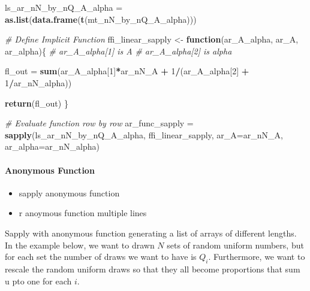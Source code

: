 \documentclass[
]{book}
\newenvironment{Shaded}{\begin{snugshade}}{\end{snugshade}}
\newcommand{\CommentTok}[1]{\textcolor[rgb]{0.56,0.35,0.01}{\textit{#1}}}
\newcommand{\ControlFlowTok}[1]{\textcolor[rgb]{0.13,0.29,0.53}{\textbf{#1}}}
\newcommand{\DataTypeTok}[1]{\textcolor[rgb]{0.13,0.29,0.53}{#1}}
\newcommand{\DecValTok}[1]{\textcolor[rgb]{0.00,0.00,0.81}{#1}}
\newcommand{\KeywordTok}[1]{\textcolor[rgb]{0.13,0.29,0.53}{\textbf{#1}}}
\newcommand{\NormalTok}[1]{#1}
\newcommand{\OperatorTok}[1]{\textcolor[rgb]{0.81,0.36,0.00}{\textbf{#1}}}
\newcommand{\StringTok}[1]{\textcolor[rgb]{0.31,0.60,0.02}{#1}}
\providecommand{\tightlist}{%
  \setlength{\itemsep}{0pt}\setlength{\parskip}{0pt}}
\begin{document}
\begin{Shaded}
\begin{Highlighting}[]
\NormalTok{ls\_ar\_nN\_by\_nQ\_A\_alpha =}\StringTok{ }\KeywordTok{as.list}\NormalTok{(}\KeywordTok{data.frame}\NormalTok{(}\KeywordTok{t}\NormalTok{(mt\_nN\_by\_nQ\_A\_alpha)))}

\CommentTok{\# Define Implicit Function}
\NormalTok{ffi\_linear\_sapply \textless{}{-}}\StringTok{ }\ControlFlowTok{function}\NormalTok{(ar\_A\_alpha, ar\_A, ar\_alpha)\{}
  \CommentTok{\# ar\_A\_alpha[1] is A}
  \CommentTok{\# ar\_A\_alpha[2] is alpha}

\NormalTok{  fl\_out =}\StringTok{ }\KeywordTok{sum}\NormalTok{(ar\_A\_alpha[}\DecValTok{1}\NormalTok{]}\OperatorTok{*}\NormalTok{ar\_nN\_A }\OperatorTok{+}
\StringTok{                 }\DecValTok{1}\OperatorTok{/}\NormalTok{(ar\_A\_alpha[}\DecValTok{2}\NormalTok{] }\OperatorTok{+}\StringTok{ }\DecValTok{1}\OperatorTok{/}\NormalTok{ar\_nN\_alpha))}

  \KeywordTok{return}\NormalTok{(fl\_out)}
\NormalTok{\}}

\CommentTok{\# Evaluate function row by row}
\NormalTok{ar\_func\_sapply =}\StringTok{ }\KeywordTok{sapply}\NormalTok{(ls\_ar\_nN\_by\_nQ\_A\_alpha, ffi\_linear\_sapply,}
                        \DataTypeTok{ar\_A=}\NormalTok{ar\_nN\_A, }\DataTypeTok{ar\_alpha=}\NormalTok{ar\_nN\_alpha)}
\end{Highlighting}
\end{Shaded}

\hypertarget{anonymous-function-1}{%
\paragraph{Anonymous Function}\label{anonymous-function-1}}

\begin{itemize}
\tightlist
\item
  sapply anonymous function
\item
  r anoymous function multiple lines
\end{itemize}

Sapply with anonymous function generating a list of arrays of different lengths. In the example below, we want to drawn \(N\) sets of random uniform numbers, but for each set the number of draws we want to have is \(Q_i\). Furthermore, we want to rescale the random uniform draws so that they all become proportions that sum u pto one for each \(i\).
\end{document}
